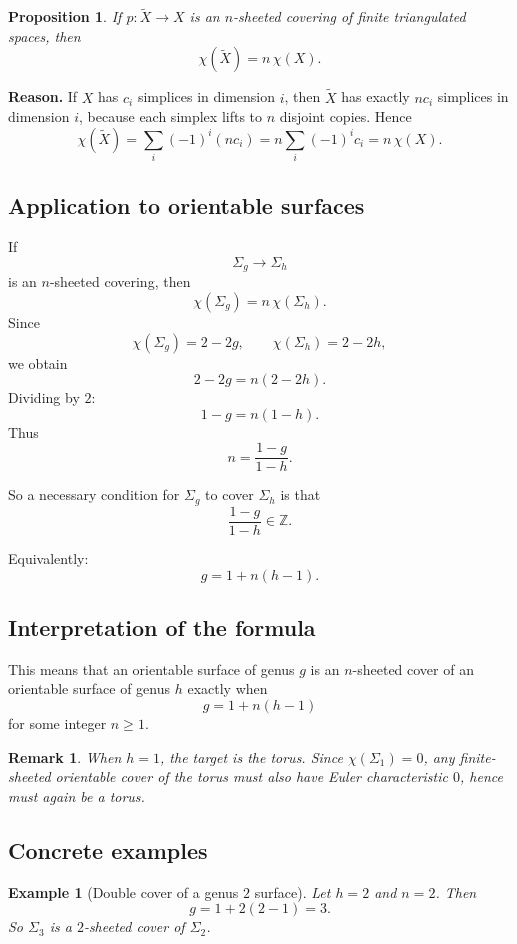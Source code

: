 \documentclass[12pt,a4paper]{article}
\newcommand{\Z}{\mathbb{Z}}
\newcommand{\Chi}{\chi}
\newtheorem{proposition}{Proposition}
\newtheorem{example}{Example}
\theoremstyle{notespace}
\newtheorem{remark}{Remark}[section]
\begin{document}
	\begin{proposition}
		If $p:\widetilde X\to X$ is an $n$-sheeted covering of finite triangulated spaces, then
		\[
		\Chi(\widetilde X)=n\,\Chi(X).
		\]
	\end{proposition}
	
	\textbf{Reason.}
	If $X$ has $c_i$ simplices in dimension $i$, then $\widetilde X$ has exactly $nc_i$ simplices in dimension $i$, because each simplex lifts to $n$ disjoint copies. Hence
	\[
	\Chi(\widetilde X)=\sum_i (-1)^i (nc_i)=n\sum_i (-1)^i c_i=n\,\Chi(X).
	\]
	
	\subsection{Application to orientable surfaces}
	
	If
	\[
	\Sigma_g\to \Sigma_h
	\]
	is an $n$-sheeted covering, then
	\[
	\Chi(\Sigma_g)=n\,\Chi(\Sigma_h).
	\]
	Since
	\[
	\Chi(\Sigma_g)=2-2g,\qquad \Chi(\Sigma_h)=2-2h,
	\]
	we obtain
	\[
	2-2g=n(2-2h).
	\]
	Dividing by $2$:
	\[
	1-g=n(1-h).
	\]
	Thus
	\[
	n=\frac{1-g}{1-h}.
	\]
	
	So a necessary condition for $\Sigma_g$ to cover $\Sigma_h$ is that
	\[
	\frac{1-g}{1-h}\in \Z.
	\]
	
	Equivalently:
	\[
	g=1+n(h-1).
	\]
	
	\subsection{Interpretation of the formula}
	
	This means that an orientable surface of genus $g$ is an $n$-sheeted cover of an orientable surface of genus $h$ exactly when
	\[
	g=1+n(h-1)
	\]
	for some integer $n\ge 1$.
	
	\begin{remark}
		When $h=1$, the target is the torus. Since $\Chi(\Sigma_1)=0$, any finite-sheeted orientable cover of the torus must also have Euler characteristic $0$, hence must again be a torus.
	\end{remark}
	
	\subsection{Concrete examples}
	
	\begin{example}[Double cover of a genus $2$ surface]
		Let $h=2$ and $n=2$. Then
		\[
		g=1+2(2-1)=3.
		\]
		So $\Sigma_3$ is a $2$-sheeted cover of $\Sigma_2$.
	\end{example}
	
\end{document}
